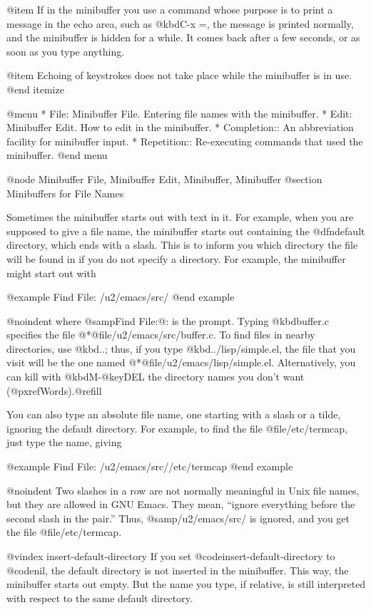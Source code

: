 {{{{{{@item
If in the minibuffer you use a command whose purpose is to print a
message in the echo area, such as @kbd{C-x =}, the message is printed
normally, and the minibuffer is hidden for a while.  It comes back
after a few seconds, or as soon as you type anything.

@item
Echoing of keystrokes does not take place while the minibuffer is in
use.
@end itemize

@menu
* File: Minibuffer File.  Entering file names with the minibuffer.
* Edit: Minibuffer Edit.  How to edit in the minibuffer.
* Completion::		  An abbreviation facility for minibuffer input.
* Repetition::		  Re-executing commands that used the minibuffer.
@end menu

@node Minibuffer File, Minibuffer Edit, Minibuffer, Minibuffer
@section Minibuffers for File Names

  Sometimes the minibuffer starts out with text in it.  For example, when
you are supposed to give a file name, the minibuffer starts out containing
the @dfn{default directory}, which ends with a slash.  This is to inform
you which directory the file will be found in if you do not specify a
directory.  For example, the minibuffer might start out with

@example
Find File: /u2/emacs/src/
@end example

@noindent
where @samp{Find File:@: } is the prompt.  Typing @kbd{buffer.c} specifies
the file 
@*@file{/u2/emacs/src/buffer.c}.  To find files in nearby
directories, use @kbd{..}; thus, if you type @kbd{../lisp/simple.el}, the
file that you visit will be the one named 
@*@file{/u2/emacs/lisp/simple.el}.
Alternatively, you can kill with @kbd{M-@key{DEL}} the directory names you
don't want (@pxref{Words}).@refill

  You can also type an absolute file name, one starting with a slash or a
tilde, ignoring the default directory.  For example, to find the file
@file{/etc/termcap}, just type the name, giving

@example
Find File: /u2/emacs/src//etc/termcap
@end example

@noindent
Two slashes in a row are not normally meaningful in Unix file names, but
they are allowed in GNU Emacs.  They mean, ``ignore everything before the
second slash in the pair.''  Thus, @samp{/u2/emacs/src/} is ignored, and
you get the file @file{/etc/termcap}.

@vindex insert-default-directory
  If you set @code{insert-default-directory} to @code{nil}, the default directory
is not inserted in the minibuffer.  This way, the minibuffer starts out
empty.  But the name you type, if relative, is still interpreted with
respect to the same default directory.

}}}}}}
